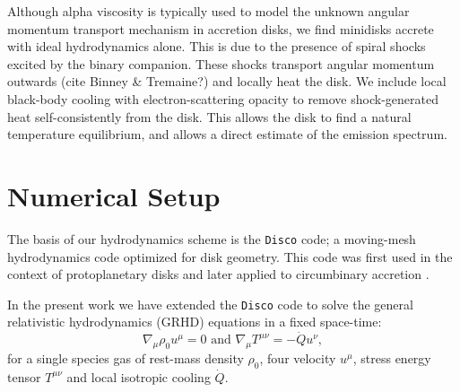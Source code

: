 \documentclass{emulateapj}
\newcommand{\Disco}{{\texttt{Disco}}}
\begin{document}
Although alpha viscosity is typically used to model the unknown angular 
momentum transport mechanism in accretion disks, we find minidisks accrete with
ideal hydrodynamics alone.  This is due to the presence of spiral shocks excited by the binary companion. These shocks transport angular momentum outwards (cite Binney \& Tremaine?) and locally heat the disk. We include local 
black-body cooling with electron-scattering opacity to remove shock-generated
heat self-consistently from the disk.  This allows the disk to find a natural
temperature equilibrium, and allows a direct estimate of the emission spectrum.




\section{Numerical Setup}
\label{sec:numerics}


The basis of our hydrodynamics scheme is the \Disco{} code; a moving-mesh hydrodynamics
code optimized for disk geometry. This code was first used in the context of
protoplanetary disks \citep{Duffell12, Duffell13, Duffell14} and later applied 
to circumbinary accretion \citep{Farris14, Farris15A, Farris15B}. 

In the present work we have extended the \Disco{} code to solve the general relativistic hydrodynamics (GRHD) equations in a fixed space-time:
\begin{equation}
    \nabla_\mu \rho_0 u^\mu = 0 \text{ and } \nabla_\mu T^{\mu\nu} = -\dot{Q} u^\nu , \label{eq:GRHD}
\end{equation}
for a single species gas of rest-mass density $\rho_0$, four velocity $u^\mu$, 
stress energy tensor $T^{\mu\nu}$ and local isotropic cooling $\dot{Q}$.  
\end{document}
